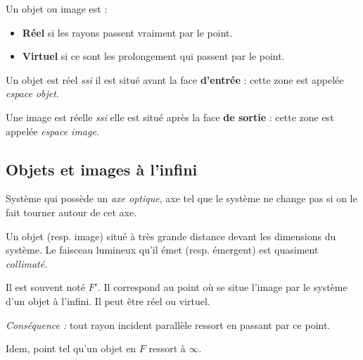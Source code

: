 \documentclass[11pt]{article}
\theoremstyle{cstyle}{\newtheorem{definition}{Définition}[section]}
\theoremstyle{cstyle}{\newtheorem{proposition}[definition]{Propriété}}
\theoremstyle{cstyle}{\newtheorem{theorem}[definition]{Théorème}}
\theoremstyle{mystyle}{\newtheorem{lemma}[definition]{Lemme}}
\theoremstyle{mystyle}{\newtheorem{corollary}[definition]{Corollaire}}
\theoremstyle{mystyle}{\newtheorem*{remark}{Remarque}}
\theoremstyle{mystyle}{\newtheorem*{remarks}{Remarques}}
\theoremstyle{mystyle}{\newtheorem*{example}{Exemple}}
\theoremstyle{mystyle}{\newtheorem*{examples}{Exemples}}
\theoremstyle{definition}{\newtheorem*{exercise}{Exercice}}
\theoremstyle{mystyle}{\newtheorem*{methode}{Méthode}}
\theoremstyle{cstyle}{\newtheorem*{cthm}{}}
\theoremstyle{warn}
\begin{document}
	\hfill
	\begin{minipage}[t]{0.46\textwidth}
		\begin{definition}
			Un objet ou image est :
			\begin{itemize}
				\item \textbf{Réel} si les rayons passent vraiment par le point.
				\item \textbf{Virtuel} si ce sont les prolongement qui passent par le point.
			\end{itemize}
		\end{definition}
		\begin{proposition}
			Un objet est réel \textit{ssi} il est situé avant la face \textbf{d'entrée} : cette zone est appelée \textit{espace objet}.
			
			Une image est réelle \textit{ssi} elle est situé après la face \textbf{de sortie} : cette zone est appelée \textit{espace image}.
		\end{proposition}
	
		\subsection{Objets et images à l'infini}
		\begin{definition}
			Système qui possède un \textit{axe optique}, axe tel que le système ne change pas si on le fait tourner autour de cet axe.
		\end{definition}
	
		\begin{definition}
			Un objet (resp. image) situé à très grande distance devant les dimensions du système. Le faisceau lumineux qu'il émet (resp. émergent) est quasiment \textit{collimaté}.
		\end{definition}
	
		\begin{definition}
			Il est souvent noté \(F'\). Il correspond au point où se situe l'image par le système d'un objet à l'infini. Il peut être réel ou virtuel.
			
			\textit{Conséquence :} tout rayon incident parallèle ressort en passant par ce point.
		\end{definition}
	
		\begin{definition}
			Idem, point tel qu'un objet en \(F\) ressort à \(\infty\).
		\end{definition}
	\end{minipage}
\end{document}
